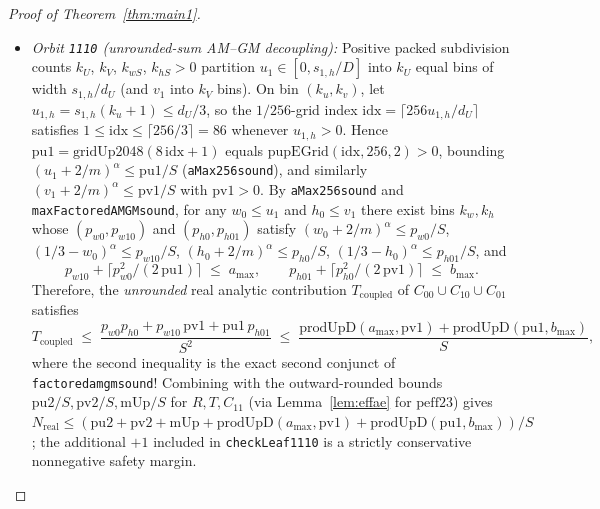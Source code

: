 \documentclass[11pt,reqno]{amsart}
\theoremstyle{plain}
\theoremstyle{definition}
\theoremstyle{remark}
\DeclareRobustCommand{\_}{\ifmmode\text{\textunderscore}\else\textunderscore\allowbreak\fi}
\begin{document}
\begin{proof}[Proof of Theorem~\ref{thm:main1}]
\begin{enumerate}[label=(\alph*),leftmargin=2em]
\begin{itemize}[leftmargin=1.4em]
    \item \emph{Orbit \texttt{1110} (unrounded-sum AM--GM decoupling):} Positive packed subdivision counts $k_U$, $k_V$, $k_{wS}$, $k_{hS} > 0$ partition $u_1 \in [0, s_{1,h}/D]$ into $k_U$ equal bins of width $s_{1,h}/d_U$ (and $v_1$ into $k_V$ bins). On bin $(k_u, k_v)$, let $u_{1,h} = s_{1,h}(k_u + 1) \le d_U/3$, so the $1/256$-grid index $\mathrm{idx} = \lceil 256 u_{1,h} / d_U \rceil$ satisfies $1 \le \mathrm{idx} \le \lceil 256/3 \rceil = 86$ whenever $u_{1,h} > 0$. Hence $\mathrm{pu1} = \mathrm{gridUp2048}(8\,\mathrm{idx} + 1)$ equals $\mathrm{pupEGrid}(\mathrm{idx}, 256, 2) > 0$, bounding $(u_1 + 2/m)^\alpha \le \mathrm{pu1} / S$ (\texttt{aMax256\_sound}), and similarly $(v_1 + 2/m)^\alpha \le \mathrm{pv1} / S$ with $\mathrm{pv1} > 0$. By \texttt{aMax256\_sound} and \texttt{maxFactoredAMGM\_sound}, for any $w_0 \le u_1$ and $h_0 \le v_1$ there exist bins $k_w, k_h$ whose $(p_{w0}, p_{w10})$ and $(p_{h0}, p_{h01})$ satisfy $(w_0 + 2/m)^\alpha \le p_{w0}/S$, $(1/3 - w_0)^\alpha \le p_{w10}/S$, $(h_0 + 2/m)^\alpha \le p_{h0}/S$, $(1/3 - h_0)^\alpha \le p_{h01}/S$, and
    \[
      p_{w10} + \bigl\lceil p_{w0}^2 / (2\,\mathrm{pu1}) \bigr\rceil \;\le\; a_{\max}, \qquad
      p_{h01} + \bigl\lceil p_{h0}^2 / (2\,\mathrm{pv1}) \bigr\rceil \;\le\; b_{\max}.
    \]
    Therefore, the \emph{unrounded} real analytic contribution $T_{\mathrm{coupled}}$ of $C_{00} \cup C_{10} \cup C_{01}$ satisfies
    \[
      T_{\mathrm{coupled}} \;\le\; \frac{p_{w0} p_{h0} + p_{w10}\,\mathrm{pv1} + \mathrm{pu1}\,p_{h01}}{S^2}
      \;\le\; \frac{\mathrm{prodUpD}(a_{\max}, \mathrm{pv1}) + \mathrm{prodUpD}(\mathrm{pu1}, b_{\max})}{S},
    \]
    where the second inequality is the exact second conjunct of \texttt{factored\_amgm\_1110\_sound}! Combining with the outward-rounded bounds $\mathrm{pu2}/S, \mathrm{pv2}/S, \mathrm{mUp}/S$ for $R, T, C_{11}$ (via Lemma~\ref{lem:effae} for $\mathrm{peff23}$) gives $N_{\mathrm{real}} \le (\mathrm{pu2} + \mathrm{pv2} + \mathrm{mUp} + \mathrm{prodUpD}(a_{\max}, \mathrm{pv1}) + \mathrm{prodUpD}(\mathrm{pu1}, b_{\max})) / S$; the additional $+1$ included in \texttt{checkLeaf1110} is a strictly conservative nonnegative safety margin.

\end{itemize}
\end{enumerate}
\end{proof}
\end{document}
